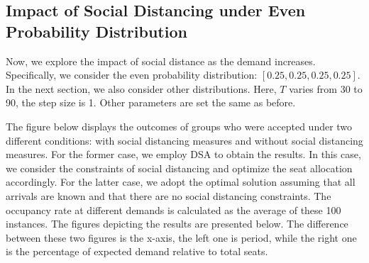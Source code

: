 \subsection{Impact of Social Distancing under Even Probability Distribution}
Now, we explore the impact of social distance as the demand increases. Specifically, we consider the even probability distribution: $[0.25, 0.25, 0.25, 0.25]$. In the next section, we also consider other 
distributions. Here, $T$ varies from 30 to 90, the step size is 1. Other parameters are set the same as before.




The figure below displays the outcomes of groups who were accepted under two different conditions: with social distancing measures and without social distancing measures. For the former case, we employ DSA to obtain the results. In this case, we consider the constraints of social distancing and optimize the seat allocation accordingly. For the latter case, we adopt the optimal solution assuming that all arrivals are known and that there are no social distancing constraints. The occupancy rate at different demands is calculated as the average of these 100 instances. The figures depicting the results are presented below. The difference between these two figures is the x-axis, the left one is period, while the right one is the percentage of expected demand relative to total seats. 


